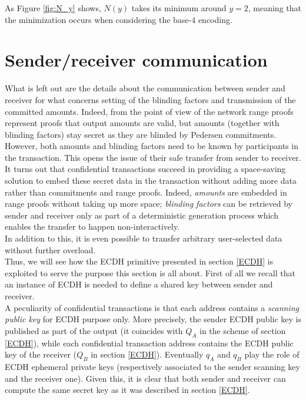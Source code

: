As Figure \ref{fig:N_y} shows, $N(y)$ takes its minimum around $y=2$, meaning that the minimization occurs when considering the base-4 encoding.

\section{Sender/receiver communication}
\label{sender_recv_comm}
What is left out are the details about the communication between sender and receiver for what concerns setting of the blinding factors and transmission of the committed amounts. Indeed, from the point of view of the network range proofs represent proofs that output amounts are valid, but amounts (together with blinding factors) stay secret as they are blinded by Pedersen commitments. However, both amounts and blinding factors need to be known by participants in the transaction. This opens the issue of their safe transfer from sender to receiver.\\
It turns out that confidential transactions succeed in providing a space-saving solution to embed these secret data in the transaction without adding more data rather than commitments and range proofs. Indeed, \textit{amounts} are embedded in range proofs without taking up more space; \textit{blinding factors} can be retrieved by sender and receiver only as part of a deterministic generation process which enables the transfer to happen non-interactively.\\
In addition to this, it is even possible to transfer arbitrary user-selected data without further overload.\\
Thus, we will see how the ECDH primitive presented in section \ref{ECDH} is exploited to serve the purpose this section is all about. First of all we recall that an instance of ECDH is needed to define a shared key between sender and receiver.\\
A peculiarity of confidential transactions is that each address contains a \textit{scanning public key} for ECDH purpose only. More precisely, the sender ECDH public key is published as part of the output (it coincides with $Q_A$ in the scheme of section \ref{ECDH}), while each confidential transaction address contains the ECDH public key of the receiver ($Q_B$ in section \ref{ECDH}). Eventually $q_A$ and $q_B$ play the role of ECDH ephemeral private keys (respectively associated to the sender scanning key and the receiver one). Given this, it is clear that both sender and receiver can compute the same secret key as it was described in section \ref{ECDH}.\\ 
